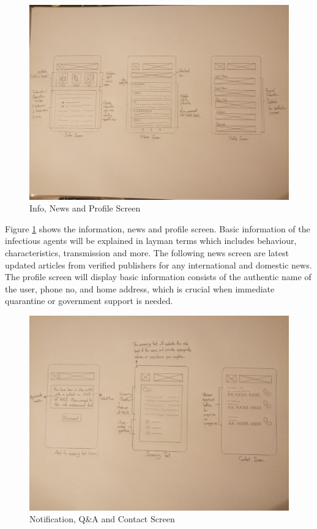       \begin{figure}[H]
        \centering
        \includegraphics[width=\linewidth]{img/low-fidelity-prototype/sketch-2.png}
        \caption{Info, News and Profile Screen}
        \label{fig:prototype-02}
      \end{figure}

      \par Figure \ref{fig:prototype-02} shows the information, news and profile screen. Basic information of the infectious agents will be explained in layman terms which includes behaviour, characteristics, transmission and more. The following news screen are latest updated articles from verified publishers for any international and domestic news. The profile screen will display basic information consists of the authentic name of the user, phone no, and home address, which is crucial when immediate quarantine or government support is needed.

      \begin{figure}[H]
        \centering
        \includegraphics[width=\linewidth]{img/low-fidelity-prototype/sketch-3.png}
        \caption{Notification, Q\&A and Contact Screen}
        \label{fig:prototype-03}
      \end{figure}
      
